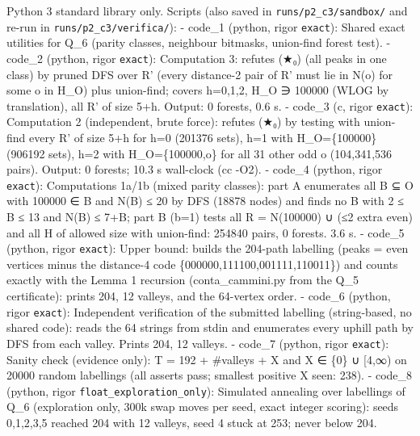 Python 3 standard library only. Scripts (also saved in
\texttt{runs/p2\_c3/sandbox/} and re-run in
\texttt{runs/p2\_c3/verifica/}): - code\_1 (python, rigor
\texttt{exact}): Shared exact utilities for Q\_6 (parity classes,
neighbour bitmasks, union-find forest test). - code\_2 (python, rigor
\texttt{exact}): Computation 3: refutes (★₀) (all peaks in one class) by
pruned DFS over R' (every distance-2 pair of R' must lie in N(o) for
some o in H\_O) plus union-find; covers h=0,1,2, H\_O ∋ 100000 (WLOG by
translation), all R' of size 5+h. Output: 0 forests, 0.6 s. - code\_3
(c, rigor \texttt{exact}): Computation 2 (independent, brute force):
refutes (★₀) by testing with union-find every R' of size 5+h for h=0
(201376 sets), h=1 with H\_O=\{100000\} (906192 sets), h=2 with
H\_O=\{100000,o\} for all 31 other odd o (104,341,536 pairs). Output: 0
forests; 10.3 s wall-clock (cc -O2). - code\_4 (python, rigor
\texttt{exact}): Computations 1a/1b (mixed parity classes): part A
enumerates all B ⊆ O with 100000 ∈ B and \textbar N(B)\textbar{} ≤ 20 by
DFS (18878 nodes) and finds no B with 2 ≤ \textbar B\textbar{} ≤ 13 and
\textbar N(B)\textbar{} ≤ 7+\textbar B\textbar; part B (b=1) tests all R
= N(100000) ∪ (≤2 extra even) and all H of allowed size with union-find:
254840 pairs, 0 forests. 3.6 s. - code\_5 (python, rigor
\texttt{exact}): Upper bound: builds the 204-path labelling (peaks =
even vertices minus the distance-4 code \{000000,111100,001111,110011\})
and counts exactly with the Lemma 1 recursion (conta\_cammini.py from
the Q\_5 certificate): prints 204, 12 valleys, and the 64-vertex order.
- code\_6 (python, rigor \texttt{exact}): Independent verification of
the submitted labelling (string-based, no shared code): reads the 64
strings from stdin and enumerates every uphill path by DFS from each
valley. Prints 204, 12 valleys. - code\_7 (python, rigor
\texttt{exact}): Sanity check (evidence only): T = 192 + \#valleys + X
and X ∈ \{0\} ∪ {[}4,∞) on 20000 random labellings (all asserts pass;
smallest positive X seen: 238). - code\_8 (python, rigor
\texttt{float\_exploration\_only}): Simulated annealing over labellings
of Q\_6 (exploration only, 300k swap moves per seed, exact integer
scoring): seeds 0,1,2,3,5 reached 204 with 12 valleys, seed 4 stuck at
253; never below 204.

